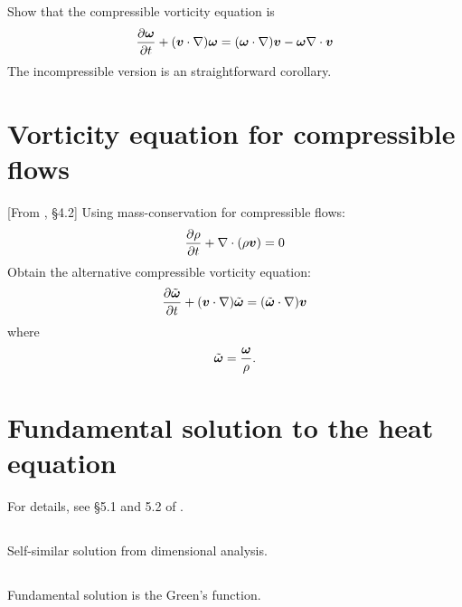 \documentclass[11pt,letterpaper]{report}
\begin{document}
\subsection{}
Show that the compressible vorticity equation is
\begin{align}
    \frac{\partial\boldsymbol{\omega}}{\partial t}+(\boldsymbol{v}\cdot \nabla)\boldsymbol{\omega} = (\boldsymbol{\omega}\cdot \nabla)\boldsymbol{v}-\boldsymbol{\omega}\nabla\cdot\boldsymbol{v}
\end{align}
The incompressible version is an straightforward corollary. 

\section{Vorticity equation for compressible flows}
[From \cite{Vallis_17}, \S 4.2] Using mass-conservation for compressible flows:
\begin{align}
    \frac{\partial\rho}{\partial t}+\nabla\cdot(\rho\boldsymbol{v}) = 0
\end{align}
Obtain the alternative compressible vorticity equation:
\begin{align}
    \frac{\partial\tilde{\boldsymbol{\omega}}}{\partial t}+(\boldsymbol{v}\cdot \nabla)\tilde{\boldsymbol{\omega}} = (\tilde{\boldsymbol{\omega}}\cdot \nabla)\boldsymbol{v}
\end{align}
where
\begin{align}
    \tilde{\boldsymbol{\omega}} = \frac{\boldsymbol{\omega}}{\rho}.
\end{align}

\section{Fundamental solution to the heat equation}
For details, see \S 5.1 and 5.2 of \cite{ShearerLevy_15}.

\subsection{}
Self-similar solution from dimensional analysis. 

\subsection{}
Fundamental solution is the Green's function.

\newpage
\printbibliography
\end{document}
